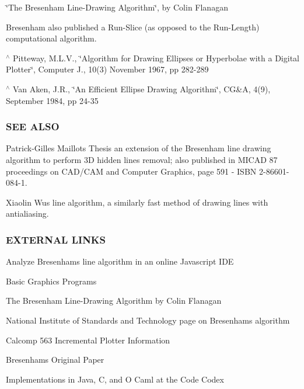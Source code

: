 \begin{DoxyItemize}
\item \char`\"{}\+The Bresenham Line-\/\+Drawing Algorithm\char`\"{}, by Colin Flanagan
\end{DoxyItemize}

Bresenham also published a Run-\/\+Slice (as opposed to the Run-\/\+Length) computational algorithm.


\begin{DoxyEnumerate}
\item $^\wedge$ Pitteway, M.\+L.\+V., \char`\"{}\+Algorithm for Drawing Ellipses or Hyperbolae with a Digital Plotter\char`\"{}, Computer J., 10(3) November 1967, pp 282-\/289
\item $^\wedge$ Van Aken, J.\+R., \char`\"{}\+An Efficient Ellipse Drawing Algorithm\char`\"{}, CG\&A, 4(9), September 1984, pp 24-\/35
\end{DoxyEnumerate}

\subsubsection*{S\+EE A\+L\+SO}


\begin{DoxyItemize}
\item Patrick-\/\+Gilles Maillot\textquotesingle{}s Thesis an extension of the Bresenham line drawing algorithm to perform 3D hidden lines removal; also published in M\+I\+C\+AD \textquotesingle{}87 proceedings on C\+A\+D/\+C\+AM and Computer Graphics, page 591 -\/ I\+S\+BN 2-\/86601-\/084-\/1.
\item Xiaolin Wu\textquotesingle{}s line algorithm, a similarly fast method of drawing lines with antialiasing.
\end{DoxyItemize}

\subsubsection*{E\+X\+T\+E\+R\+N\+AL L\+I\+N\+KS}


\begin{DoxyItemize}
\item Analyze Bresenham\textquotesingle{}s line algorithm in an online Javascript I\+DE
\item Basic Graphics Programs
\item The Bresenham Line-\/\+Drawing Algorithm by Colin Flanagan
\item National Institute of Standards and Technology page on Bresenham\textquotesingle{}s algorithm
\item Calcomp 563 Incremental Plotter Information
\item Bresenham\textquotesingle{}s Original Paper
\item Implementations in Java, C, and O Caml at the Code Codex
\end{DoxyItemize}

